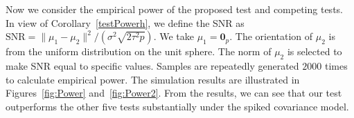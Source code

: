 \documentclass[3p]{elsarticle}
\theoremstyle{plain}
\theoremstyle{definition}
\theoremstyle{remark}
\begin{document}
Now we consider the empirical power of the proposed test and competing tests.
In view of Corollary~\ref{testPowerh}, we define the SNR as $\textrm{SNR}=\|\mu_1-\mu_2\|^2/(\sigma^2\sqrt{2\tau^2 p})$.
We take $\mu_1=\mathbf{0}_p$.
The orientation of $\mu_2$ is from the uniform distribution on the unit sphere.
The norm of $\mu_2$ is selected to make SNR equal to specific values.
Samples are repeatedly generated $2000$ times to calculate empirical power.
The simulation results are illustrated in Figures~\ref{fig:Power} and~\ref{fig:Power2}.
From the results, we can see that our test outperforms the other five tests substantially under the spiked covariance model.

\begin{figure}
    \centering 
    \\
\end{figure}
\end{document}
